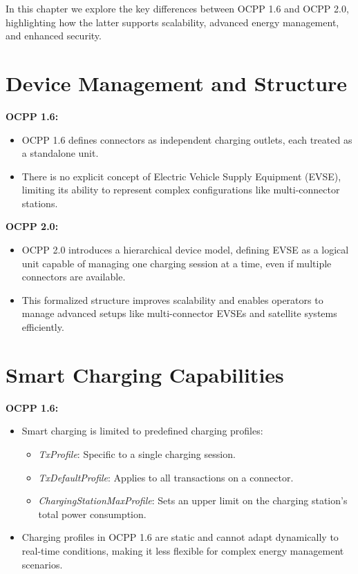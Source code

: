 \documentclass[12pt,a4paper]{report}
\begin{document}
In this chapter we explore the key differences between OCPP 1.6 and OCPP 2.0, highlighting
how the latter supports scalability, advanced energy management, and enhanced security.

\section{Device Management and Structure}

\textbf{OCPP 1.6:}
\begin{itemize}
  \item OCPP 1.6 defines connectors as independent charging outlets, each treated as a
        standalone unit.
  \item There is no explicit concept of Electric Vehicle Supply Equipment (EVSE), limiting its
        ability to represent complex configurations like multi-connector stations.
\end{itemize}

\textbf{OCPP 2.0:}
\begin{itemize}
  \item OCPP 2.0 introduces a hierarchical device model, defining EVSE as a logical unit
        capable of managing one charging session at a time, even if multiple connectors are
        available.
  \item This formalized structure improves scalability and enables operators to manage advanced
        setups like multi-connector EVSEs and satellite systems efficiently.
\end{itemize}

\section{Smart Charging Capabilities}

\textbf{OCPP 1.6:}
\begin{itemize}
  \item Smart charging is limited to predefined charging profiles:
        \begin{itemize}
          \item \textit{TxProfile}: Specific to a single charging session.
          \item \textit{TxDefaultProfile}: Applies to all transactions on a connector.
          \item \textit{ChargingStationMaxProfile}: Sets an upper limit on the charging
                station's total power consumption.
        \end{itemize}
  \item Charging profiles in OCPP 1.6 are static and cannot adapt dynamically to real-time
        conditions, making it less flexible for complex energy management scenarios.
\end{itemize}
\end{document}
